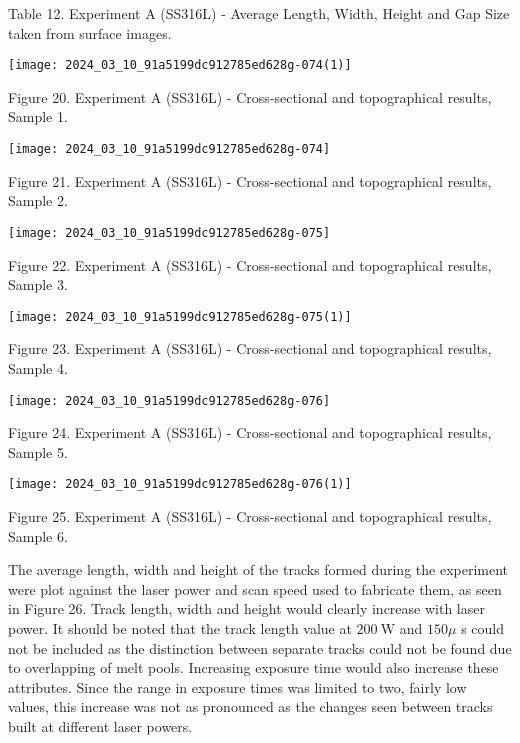 \documentclass[10pt]{article}
\begin{document}
Table 12. Experiment A (SS316L) - Average Length, Width, Height and Gap Size taken from surface images.

\begin{center}
\texttt{[image: 2024\_03\_10\_91a5199dc912785ed628g-074(1)]}
\end{center}

Figure 20. Experiment A (SS316L) - Cross-sectional and topographical results, Sample 1.

\begin{center}
\texttt{[image: 2024\_03\_10\_91a5199dc912785ed628g-074]}
\end{center}

Figure 21. Experiment A (SS316L) - Cross-sectional and topographical results, Sample 2.

\begin{center}
\texttt{[image: 2024\_03\_10\_91a5199dc912785ed628g-075]}
\end{center}

Figure 22. Experiment A (SS316L) - Cross-sectional and topographical results, Sample 3.

\begin{center}
\texttt{[image: 2024\_03\_10\_91a5199dc912785ed628g-075(1)]}
\end{center}

Figure 23. Experiment A (SS316L) - Cross-sectional and topographical results, Sample 4.

\begin{center}
\texttt{[image: 2024\_03\_10\_91a5199dc912785ed628g-076]}
\end{center}

Figure 24. Experiment A (SS316L) - Cross-sectional and topographical results, Sample 5.

\begin{center}
\texttt{[image: 2024\_03\_10\_91a5199dc912785ed628g-076(1)]}
\end{center}

Figure 25. Experiment A (SS316L) - Cross-sectional and topographical results, Sample 6.

The average length, width and height of the tracks formed during the experiment were plot against the laser power and scan speed used to fabricate them, as seen in Figure 26. Track length, width and height would clearly increase with laser power. It should be noted that the track length value at $200 \mathrm{~W}$ and $150 \mu$ s could not be included as the distinction between separate tracks could not be found due to overlapping of melt pools. Increasing exposure time would also increase these attributes. Since the range in exposure times was limited to two, fairly low values, this increase was not as pronounced as the changes seen between tracks built at different laser powers.
\end{document}
